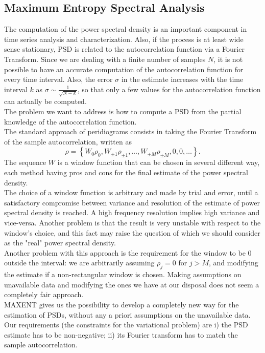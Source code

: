 \documentclass[twocolumn,showpacs,preprintnumbers,nofootinbib,prd,
superscriptaddress,10pt]{revtex4-1}
\begin{document}
\subsection{Maximum Entropy Spectral Analysis} 
The computation of the power spectral density is an important component in time series analysis and characterization. Also, if the process is at least wide sense stationary, PSD is related to the autocorrelation function via a Fourier Transform.
Since we are dealing with a finite number of samples $N$, it is not possible to have an accurate computation of the autocorrelation function for every time interval. Also, the error $\sigma$ in the estimate increases with the time interval $k$ as $\sigma \sim \frac{1}{\sqrt{N - k}}$, so that only a few values for the autocorrelation function can actually be computed. \\ 
The problem we want to address is how to compute a PSD from the partial knowledge of the autocorrelation function. \\
The standard approach of peridiograms \cite{Lomb} \cite{Scargle} consists in taking the Fourier Transform of the sample autocorrelation, written as \begin{equation}
    \rho = \left\{W_0\rho_0,W_{\pm 1}\rho_{\pm 1}, \dots, W_{\pm M}\rho_{\pm M}, 0, 0, \dots \right\}.
\end{equation}
The sequence $W$ is a window function that can be chosen in several different way, each method having pros and cons for the final estimate of the power spectral density. \\ 
The choice of a window function is arbitrary and made by trial and error, until a satisfactory compromise between variance and resolution of the estimate of power spectral density  is reached. A high frequency resolution implies high variance and vice-versa. Another problem is that the result is very unstable with respect to the window's choice, and this fact may raise the question of which we should consider as the "real" power spectral density. \\  
Another problem with this approach is the requirement for the window to be $0$ outside the interval: we are arbitrarily assuming $\rho_j = 0$ for $j > M$, and modifying the estimate if a non-rectangular window is chosen. Making assumptions on unavailable data and modifying the ones we have at our disposal does not seem a completely fair approach. \\
MAXENT gives us the possibility to develop a completely new way for the estimation of PSDs, without any a priori assumptions on the unavailable data. Our requirements (the constraints for the variational problem) are i) the PSD estimate has to be non-negative; ii) its Fourier transform has to match the sample autocorrelation. \\
\end{document}
